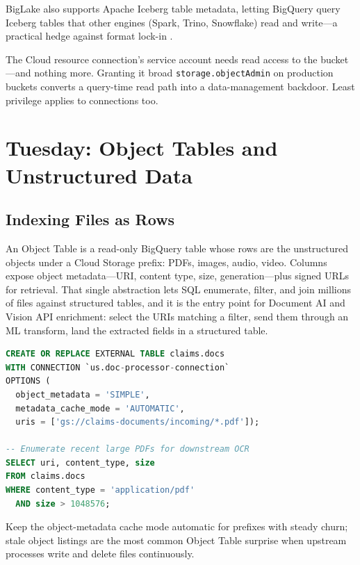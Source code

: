 \begin{notebox}
BigLake also supports Apache Iceberg table metadata, letting BigQuery query Iceberg tables that other engines (Spark, Trino, Snowflake) read and write---a practical hedge against format lock-in \cite{apacheiceberg}.
\end{notebox}

\begin{pitfall}
The Cloud resource connection's service account needs read access to the bucket---and nothing more. Granting it broad \texttt{storage.objectAdmin} on production buckets converts a query-time read path into a data-management backdoor. Least privilege applies to connections too.
\end{pitfall}

\section{Tuesday: Object Tables and Unstructured Data}

\subsection{Indexing Files as Rows}
An Object Table is a read-only BigQuery table whose rows are the unstructured objects under a Cloud Storage prefix: PDFs, images, audio, video. Columns expose object metadata---URI, content type, size, generation---plus signed URLs for retrieval. That single abstraction lets SQL enumerate, filter, and join millions of files against structured tables, and it is the entry point for Document AI and Vision API enrichment: select the URIs matching a filter, send them through an ML transform, land the extracted fields in a structured table.

\begin{lstlisting}[language=SQL,caption={Object table indexing a claims document prefix.}]
CREATE OR REPLACE EXTERNAL TABLE claims.docs
WITH CONNECTION `us.doc-processor-connection`
OPTIONS (
  object_metadata = 'SIMPLE',
  metadata_cache_mode = 'AUTOMATIC',
  uris = ['gs://claims-documents/incoming/*.pdf']);

-- Enumerate recent large PDFs for downstream OCR
SELECT uri, content_type, size
FROM claims.docs
WHERE content_type = 'application/pdf'
  AND size > 1048576;
\end{lstlisting}

\begin{tipbox}
Keep the object-metadata cache mode automatic for prefixes with steady churn; stale object listings are the most common Object Table surprise when upstream processes write and delete files continuously.
\end{tipbox}

